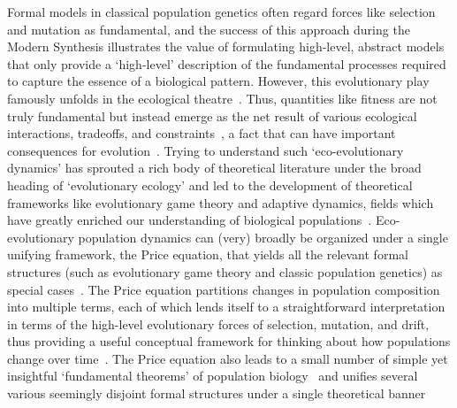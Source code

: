 Formal models in classical population genetics often regard forces like selection and mutation as fundamental, and the success of this approach during the Modern Synthesis illustrates the value of formulating high-level, abstract models that only provide a `high-level' description of the fundamental processes required to capture the essence of a biological pattern. However, this evolutionary play famously unfolds in the ecological theatre~\citep{hutchinson_ecological_1965}. Thus, quantities like fitness are not truly fundamental but instead emerge as the net result of various ecological interactions, tradeoffs, and constraints~\citep{metz_how_1992}, a fact that can have important consequences for evolution~\citep{coulson_putting_2006, kokko_can_2017}. Trying to understand such `eco-evolutionary dynamics' has sprouted a rich body of theoretical literature under the broad heading of `evolutionary ecology' and led to the development of theoretical frameworks like evolutionary game theory and adaptive dynamics, fields which have greatly enriched our understanding of biological populations~\citep{brown_why_2016}. Eco-evolutionary population dynamics can (very) broadly be organized under a single unifying framework, the Price equation, that yields all the relevant formal structures (such as evolutionary game theory and classic population genetics) as special cases~\citep{page_unifying_2002, queller_fundamental_2017, lion_theoretical_2018}. The Price equation partitions changes in population composition into multiple terms, each of which lends itself to a straightforward interpretation in terms of the high-level evolutionary forces of selection, mutation, and drift, thus providing a useful conceptual framework for thinking about how populations change over time~\citep{frank_natural_2012}. The Price equation also leads to a small number of simple yet insightful `fundamental theorems' of population biology~\citep{queller_fundamental_2017, lion_theoretical_2018, lehtonen_price_2018} and unifies several various seemingly disjoint formal structures under a single theoretical banner~\citep{ lehtonen_price_2020, luque_mirror_2021}

